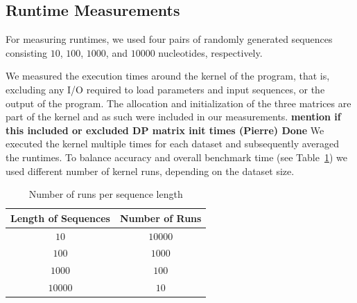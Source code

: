 \documentclass[runningheads,a4paper]{llncs}
\begin{document}
\subsection{Runtime Measurements}
\label{team2-runtimes}

For measuring runtimes, we used four pairs of randomly generated sequences consisting $10$, $100$, $1000$, and $10000$ nucleotides, respectively.

We measured the execution times around the kernel of the program, that is, excluding any I/O required to load parameters and input sequences, or the output of the program. The allocation and initialization of the three matrices are part of the kernel and as such were included in our measurements.
{\bf mention if this included or excluded DP matrix init times (Pierre) Done}
We executed the kernel multiple times for each dataset and subsequently averaged the runtimes.
To balance accuracy and overall benchmark time (see Table~\ref{fig:runs}) we used different number of kernel runs, depending on the dataset size.

\begin{table}
\centering

\begin{tabular}{|c|c|}
\hline
Length of Sequences & Number of Runs \\
\hline
$10$ & $10000$ \\
\hline
$100$ & $1000$ \\
\hline
$1000$ & $100$ \\
\hline
$10000$ & $10$ \\
\hline
\end{tabular}
\caption{Number of runs per sequence length}
\label{fig:runs}
\end{table}
\end{document}
